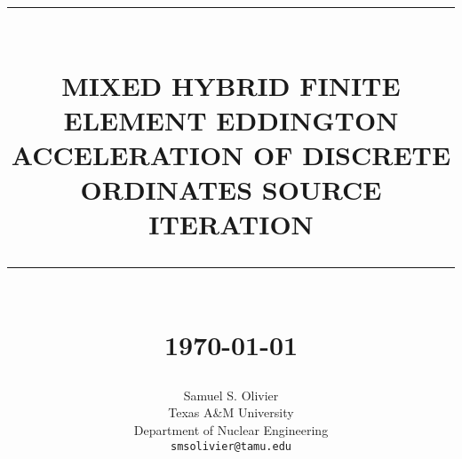 \newcommand{\HRule}[1]{\rule{\linewidth}{#1}} 	%

\makeatletter							%
\def\printtitle{%
    {\centering \@title\par}}
\makeatother									

\makeatletter							%
\def\printauthor{%
    {\centering \large \@author}}				
\makeatother							

\title{	\normalsize \textsc{} 	%
		 	\\[2.0cm]								%
			\HRule{0.5pt} \\						%
			\LARGE \textbf{\uppercase{Mixed Hybrid Finite Element Eddington Acceleration of Discrete Ordinates Source Iteration}}	%
			\HRule{2pt} \\ [0.5cm]		%
			\normalsize \today			%
		}

\author{
		Samuel S. Olivier\\	
		Texas A\&M University\\	
		Department of Nuclear Engineering\\
        \texttt{smsolivier@tamu.edu} \\
}

\begin{titlepage}
\thispagestyle{empty}		%

\printtitle					%
  	\vfill
\printauthor				%
\end{titlepage}
\newpage